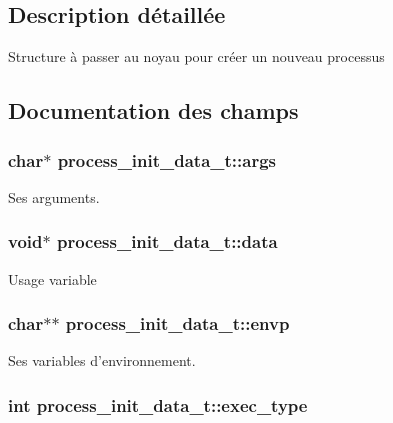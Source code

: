 \subsection{Description détaillée}
Structure à passer au noyau pour créer un nouveau processus 

\subsection{Documentation des champs}
\hypertarget{structprocess__init__data__t_a16d011771835f06e0bb3d5fd6115e13c}{
\subsubsection[{args}]{\setlength{\rightskip}{0pt plus 5cm}char$\ast$ process\+\_\+init\+\_\+data\+\_\+t\+::args}}\label{structprocess__init__data__t_a16d011771835f06e0bb3d5fd6115e13c}
Ses arguments. \hypertarget{structprocess__init__data__t_ae950cc2a2cc04d1c00a71f70c2fde72c}{
\subsubsection[{data}]{\setlength{\rightskip}{0pt plus 5cm}void$\ast$ process\+\_\+init\+\_\+data\+\_\+t\+::data}}\label{structprocess__init__data__t_ae950cc2a2cc04d1c00a71f70c2fde72c}
Usage variable \hypertarget{structprocess__init__data__t_a863d82fbd718f53164a520f67376eac2}{
\subsubsection[{envp}]{\setlength{\rightskip}{0pt plus 5cm}char$\ast$$\ast$ process\+\_\+init\+\_\+data\+\_\+t\+::envp}}\label{structprocess__init__data__t_a863d82fbd718f53164a520f67376eac2}
Ses variables d'environnement. \hypertarget{structprocess__init__data__t_a1cda790f7d2446a04562094f09e358ab}{
\subsubsection[{exec\+\_\+type}]{\setlength{\rightskip}{0pt plus 5cm}int process\+\_\+init\+\_\+data\+\_\+t\+::exec\+\_\+type}}\label{structprocess__init__data__t_a1cda790f7d2446a04562094f09e358ab}

